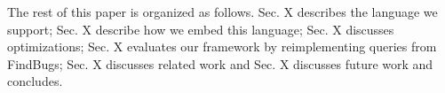 \documentclass[preprint,authoryear,10pt]{sigplanconf}
\begin{document}
The rest of this paper is organized as follows. Sec. X describes the
language we support; Sec. X describe how we embed this language; Sec. X
discusses optimizations; Sec. X evaluates our framework by
reimplementing queries from FindBugs; Sec. X discusses related work and
Sec. X discusses future work and concludes.

%
%
%
%
\end{document}
